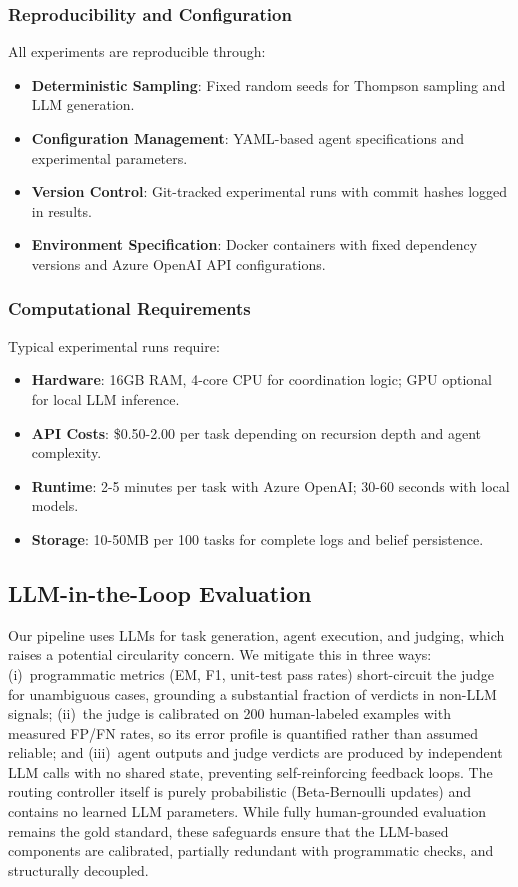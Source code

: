   \subsubsection{Reproducibility and Configuration}
  All experiments are reproducible through:
  \begin{itemize}[leftmargin=1.4em]
      \item \textbf{Deterministic Sampling}: Fixed random seeds for Thompson sampling and LLM generation.
      \item \textbf{Configuration Management}: YAML-based agent specifications and experimental parameters.
      \item \textbf{Version Control}: Git-tracked experimental runs with commit hashes logged in results.
      \item \textbf{Environment Specification}: Docker containers with fixed dependency versions and Azure OpenAI API configurations.
  \end{itemize}

  \subsubsection{Computational Requirements}
  Typical experimental runs require:
  \begin{itemize}[leftmargin=1.4em]
      \item \textbf{Hardware}: 16GB RAM, 4-core CPU for coordination logic; GPU optional for local LLM inference.
      \item \textbf{API Costs}: \$0.50-2.00 per task depending on recursion depth and agent complexity.
      \item \textbf{Runtime}: 2-5 minutes per task with Azure OpenAI; 30-60 seconds with local models.
      \item \textbf{Storage}: 10-50MB per 100 tasks for complete logs and belief persistence.
  \end{itemize}

  \subsection{LLM-in-the-Loop Evaluation}
  Our pipeline uses LLMs for task generation, agent execution, and judging, which raises a potential circularity concern. We mitigate this in three ways:
  (i)~programmatic metrics (EM, F1, unit-test pass rates) short-circuit the judge for unambiguous cases, grounding a substantial fraction of verdicts in non-LLM signals;
  (ii)~the judge is calibrated on 200 human-labeled examples with measured FP/FN rates, so its error profile is quantified rather than assumed reliable; and
  (iii)~agent outputs and judge verdicts are produced by independent LLM calls with no shared state, preventing self-reinforcing feedback loops.
  The routing controller itself is purely probabilistic (Beta-Bernoulli updates) and contains no learned LLM parameters.
  While fully human-grounded evaluation remains the gold standard, these safeguards ensure that the LLM-based components are calibrated, partially redundant with programmatic checks, and structurally decoupled.

